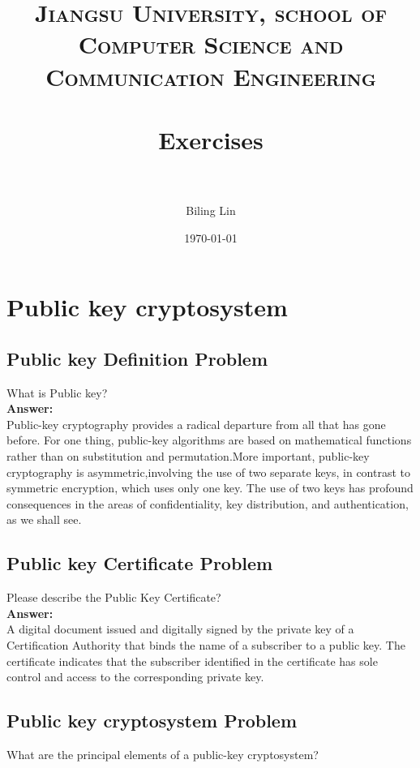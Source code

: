 \documentclass[paper=a4, fontsize=11pt]{scrartcl} %
\title{
 \normalfont \normalsize
 \textsc{Jiangsu University, school of Computer Science and Communication Engineering} \\ [25pt] %
 \horrule{0.5pt} \\[0.4cm] %
 \huge Exercises \\ %
 \horrule{2pt} \\[0.5cm] %
 }
\author{Biling Lin} %
\date{\normalsize\today} %
\numberwithin{equation}{section} %
\numberwithin{figure}{section} %
\numberwithin{table}{section} %
\begin{document}
 \maketitle %
 \section{Public key cryptosystem}
 \label{sec:pkc}

 \subsection{Public key Definition Problem \uppercase\expandafter{}}

 What is Public key?\\

 \textbf{Answer:}\\

 Public-key cryptography provides a radical departure from all that has gone before. For one thing, public-key algorithms are based on mathematical functions rather than on substitution and permutation.More important, public-key cryptography is asymmetric,involving the use of two separate keys, in contrast to symmetric encryption, which uses only one key. The use of two keys has profound consequences in the areas of confidentiality, key distribution, and authentication, as we shall see.

 \subsection{Public key Certificate Problem \uppercase\expandafter{}}

 Please describe the Public Key Certificate?\\

 \textbf{Answer:}\\

  A digital document issued and digitally signed by the private key of a Certification Authority that binds the name of a subscriber to a public key. The certificate indicates that the subscriber identified in the certificate has sole control and access to the corresponding private key.


 \subsection{Public key cryptosystem Problem \uppercase\expandafter{}}

 What are the principal elements of a public-key cryptosystem?\\
\end{document}
